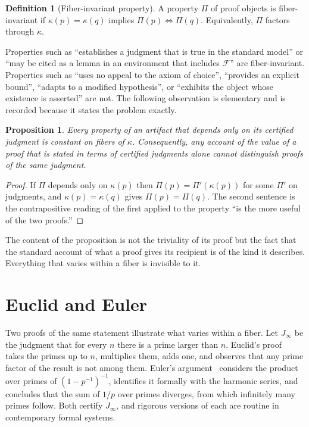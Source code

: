 \documentclass[11pt]{book}
\newtheorem{proposition}[theorem]{Proposition}
\theoremstyle{definition}
\newtheorem{definition}[theorem]{Definition}
\theoremstyle{remark}
\newcommand{\cert}{\kappa}
\newcommand{\Fenv}{\mathcal{F}}
\begin{document}
\begin{definition}[Fiber-invariant property]
A property $\Pi$ of proof objects is fiber-invariant if $\cert(p)=\cert(q)$ implies $\Pi(p)\Leftrightarrow\Pi(q)$. Equivalently, $\Pi$ factors through $\cert$.
\end{definition}

Properties such as ``establishes a judgment that is true in the standard model'' or ``may be cited as a lemma in an environment that includes $\Fenv$'' are fiber-invariant. Properties such as ``uses no appeal to the axiom of choice'', ``provides an explicit bound'', ``adapts to a modified hypothesis'', or ``exhibits the object whose existence is asserted'' are not. The following observation is elementary and is recorded because it states the problem exactly.

\begin{proposition}\label{prop:fiber}
Every property of an artifact that depends only on its certified judgment is constant on fibers of $\cert$. Consequently, any account of the value of a proof that is stated in terms of certified judgments alone cannot distinguish proofs of the same judgment.
\end{proposition}

\begin{proof}
If $\Pi$ depends only on $\cert(p)$ then $\Pi(p)=\Pi'(\cert(p))$ for some $\Pi'$ on judgments, and $\cert(p)=\cert(q)$ gives $\Pi(p)=\Pi(q)$. The second sentence is the contrapositive reading of the first applied to the property ``is the more useful of the two proofs.''
\end{proof}

The content of the proposition is not the triviality of its proof but the fact that the standard account of what a proof gives its recipient is of the kind it describes. Everything that varies within a fiber is invisible to it.

\section{Euclid and Euler}

Two proofs of the same statement illustrate what varies within a fiber. Let $J_\infty$ be the judgment that for every $n$ there is a prime larger than $n$. Euclid's proof~\cite{euclid} takes the primes up to $n$, multiplies them, adds one, and observes that any prime factor of the result is not among them. Euler's argument~\cite{euler} considers the product over primes of $(1-p^{-1})^{-1}$, identifies it formally with the harmonic series, and concludes that the sum of $1/p$ over primes diverges, from which infinitely many primes follow. Both certify $J_\infty$, and rigorous versions of each are routine in contemporary formal systems.
\end{document}
